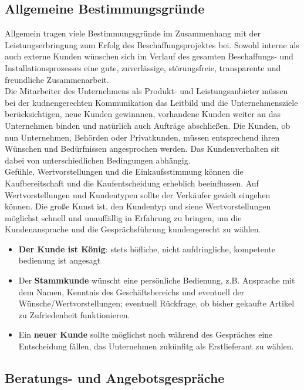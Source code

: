 \documentclass[a4paper, 12pt]{report}
\begin{document}
\subsection{Allgemeine Bestimmungsgründe}

Allgemein tragen viele Bestimmungsgründe im Zusammenhang mit der 
Leistungserbringung zum Erfolg des Beschaffungsprojektes bei. Sowohl interne als 
auch externe Kunden wünschen sich im Verlauf des gesamten Beschaffungs- und 
Installationsprozesses eine gute, zuverlässige, störungsfreie, transparente 
und freundliche Zusammenarbeit. \\

Die Mitarbeiter des Unternehmens als Produkt- und Leistungsanbieter müssen bei 
der kudnengerechten Kommunikation das Leitbild und die Unternehmensziele 
berücksichtigen, neue Kunden gewinnnen, vorhandene Kunden weiter an das 
Unternehmen binden und natürlich auch Aufträge abschließen. Die Kunden, ob nun 
Unternehmen, Behörden oder Privatkunden, müssen entsprechend ihren Wünschen 
und Bedürfnissen angesprochen werden. Das Kundenverhalten sit dabei von 
unterschiedlichen Bedingungen abhängig. \\

Gefühle, Wertvorstellungen und die Einkaufsstimmung können die Kaufbereitschaft 
und die Kaufentscheidung erheblich beeinflussen. Auf Wertvorstellungen und 
Kundentypen sollte der Verkäufer gezielt eingehen können. Die große Kunst ist, 
den Kundentyp und siene Wertvorstellungen möglichst schnell und unauffällig in 
Erfahrung zu bringen, um die Kundenansprache und die Gesprächsführung 
kundengerecht zu wählen. 

\begin{itemize}
    \item \textbf{Der Kunde ist König}: stets höfliche, nicht aufdringliche, 
        kompetente bedienung ist angesagt
    \item Der \textbf{Stammkunde} wünscht eine persönliche Bedienung, z.B. 
        Ansprache mit dem Namen, Kenntnis des Geschäftsbereichs und eventuell
        der Wünsche/Wertvorstellungen; eventuell Rückfrage, ob bisher gekaufte 
        Artikel zu Zufriedenheit funktionieren. 
    \item Ein \textbf{neuer Kunde} sollte möglichst noch während des Gespräches 
        eine Entscheidung fällen, das Unternehmen zukünfitg als 
        Erstlieferant zu wählen.   
\end{itemize}

\subsection{Beratungs- und Angebotsgespräche}
\end{document}
